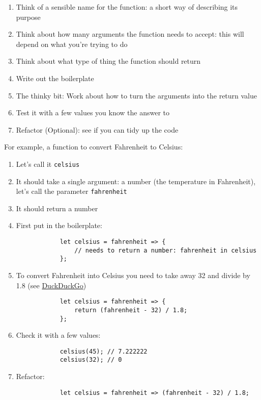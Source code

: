 \begin{enumerate}
    \item Think of a sensible name for the function: a short way of describing its purpose
    \item Think about how many arguments the function needs to accept: this will depend on what you're trying to do
    \item Think about what type of thing the function should return
    \item Write out the boilerplate
    \item The thinky bit: Work about how to turn the arguments into the return value
    \item Test it with a few values you know the answer to
    \item Refactor (Optional): see if you can tidy up the code
\end{enumerate}


For example, a function to convert Fahrenheit to Celsius:

\begin{enumerate}
    \item Let's call it \texttt{celsius}
    \item It should take a single argument: a number (the temperature in Fahrenheit), let's call the parameter \texttt{fahrenheit}
    \item It should return a number
    \item First put in the boilerplate:
        \begin{verbatim}
            let celsius = fahrenheit => {
                // needs to return a number: fahrenheit in celsius
            };
        \end{verbatim}
    \item To convert Fahrenheit into Celsius you need to take away 32 and divide by 1.8 (see \href{https://duckduckgo.com}{DuckDuckGo})
        \begin{verbatim}
            let celsius = fahrenheit => {
                return (fahrenheit - 32) / 1.8;
            };
        \end{verbatim}
    \item Check it with a few values:
        \begin{verbatim}
            celsius(45); // 7.222222
            celsius(32); // 0
        \end{verbatim}
    \item Refactor:
        \begin{verbatim}
            let celsius = fahrenheit => (fahrenheit - 32) / 1.8;
        \end{verbatim}
\end{enumerate}


